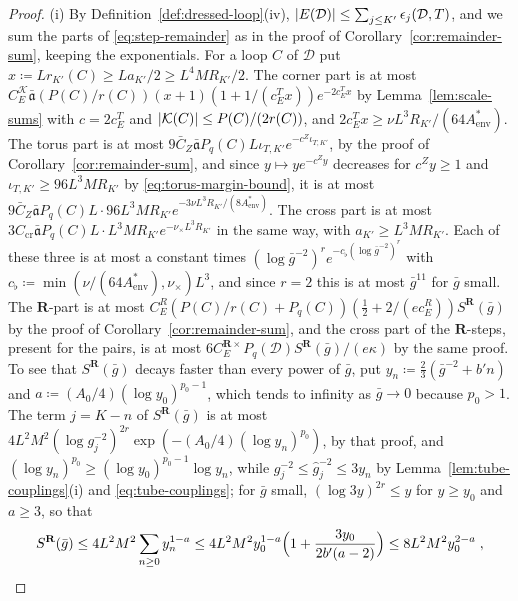 \documentclass[11pt]{preprint}
\DeclarePairedDelimiter{\abs}{\lvert}{\rvert}
\numberwithin{equation}{section}
\theoremstyle{definition}
\theoremstyle{remark}
\theoremstyle{plain}
\begin{document}
\begin{proof}
(i) By Definition~\ref{def:dressed-loop}(iv), $\abs{E(\mathcal D)} \leq \sum_{j \leq K'}\epsilon_j(\mathcal D, T)$, and we sum the parts of \eqref{eq:step-remainder} as in the proof of Corollary~\ref{cor:remainder-sum}, keeping the exponentials. For a loop $C$ of $\mathcal D$ put $x \coloneqq Lr_{K'}(C) \geq La_{K'}/2 \geq L^4MR_{K'}/2$. The corner part is at most $C^{\mathcal K}_E\bar{\mathfrak a}(P(C)/r(C))(x + 1)(1 + 1/(c^T_Ex))e^{-2c^T_Ex}$ by Lemma~\ref{lem:scale-sums} with $c = 2c^T_E$ and $\abs{\mathcal K(C)} \leq P(C)/(2r(C))$, and $2c^T_Ex \geq \nu L^3R_{K'}/(64A^*_{\mathrm{env}})$. The torus part is at most $9\bar C_Z\bar{\mathfrak a}P_q(C)L\iota_{T,K'}e^{-c^Z\iota_{T,K'}}$, by the proof of Corollary~\ref{cor:remainder-sum}, and since $y \mapsto ye^{-c^Zy}$ decreases for $c^Zy \geq 1$ and $\iota_{T,K'} \geq 96L^3MR_{K'}$ by \eqref{eq:torus-margin-bound}, it is at most $9\bar C_Z\bar{\mathfrak a}P_q(C)L \cdot 96L^3MR_{K'}e^{-3\nu L^3R_{K'}/(8A^*_{\mathrm{env}})}$. The cross part is at most $3C_{\mathrm{cr}}\bar{\mathfrak a}P_q(C)L \cdot L^3MR_{K'}e^{-\nu_\times L^3R_{K'}}$ in the same way, with $a_{K'} \geq L^3MR_{K'}$. Each of these three is at most a constant times $(\log\bar g^{-2})^re^{-c_\flat(\log\bar g^{-2})^r}$ with $c_\flat \coloneqq \min(\nu/(64A^*_{\mathrm{env}}), \nu_\times)L^3$, and since $r = 2$ this is at most $\bar g^{11}$ for $\bar g$ small. The $\mathbf R$-part is at most $C^R_E(P(C)/r(C) + P_q(C))(\frac12 + 2/(ec^R_E))S^{\mathbf R}(\bar g)$ by the proof of Corollary~\ref{cor:remainder-sum}, and the cross part of the $\mathbf R$-steps, present for the pairs, is at most $6C^{\mathbf R\times}_EP_q(\mathcal D)S^{\mathbf R}(\bar g)/(e\kappa)$ by the same proof. To see that $S^{\mathbf R}(\bar g)$ decays faster than every power of $\bar g$, put $y_n \coloneqq \frac23(\bar g^{-2} + b'n)$ and $a \coloneqq (A_0/4)(\log y_0)^{p_0-1}$, which tends to infinity as $\bar g \to 0$ because $p_0 > 1$. The term $j = K - n$ of $S^{\mathbf R}(\bar g)$ is at most $4L^2M^2(\log g_j^{-2})^{2r}\exp(-(A_0/4)(\log y_n)^{p_0})$, by that proof, and $(\log y_n)^{p_0} \geq (\log y_0)^{p_0-1}\log y_n$, while $g_j^{-2} \leq \hat g_j^{-2} \leq 3y_n$ by Lemma~\ref{lem:tube-couplings}(i) and \eqref{eq:tube-couplings}; for $\bar g$ small, $(\log3y)^{2r} \leq y$ for $y \geq y_0$ and $a \geq 3$, so that
\begin{equation}\label{eq:r-sum-decay}
    S^{\mathbf R}(\bar g) \leq 4L^2M^2\sum_{n \geq 0}y_n^{1-a} \leq 4L^2M^2y_0^{1-a}\Bigl(1 + \frac{3y_0}{2b'(a - 2)}\Bigr) \leq 8L^2M^2y_0^{2-a}\;,
\end{equation}

\end{proof}
\end{document}
